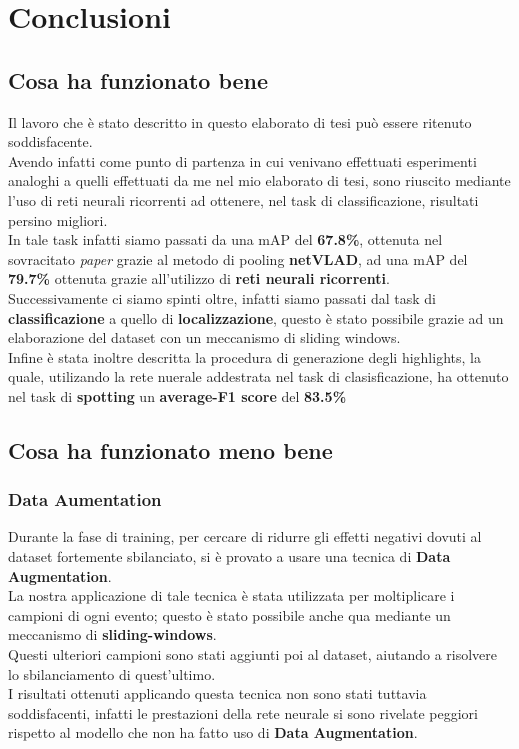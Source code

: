 \chapter{Conclusioni}\label{ch:conclusioni}
\section{Cosa ha funzionato bene}
Il lavoro che è stato descritto in questo elaborato di tesi può essere ritenuto soddisfacente.
\\Avendo infatti come punto di partenza \cite{soccerNet} in cui venivano effettuati esperimenti analoghi a quelli effettuati da me nel mio elaborato di tesi, sono riuscito mediante l'uso di reti neurali ricorrenti ad ottenere, nel task di classificazione, risultati persino migliori.
\\In tale task infatti siamo passati da una mAP del\textbf{ 67.8\%}, ottenuta nel sovracitato \textit{paper} grazie al metodo di pooling \textbf{netVLAD}, ad una mAP del \textbf{79.7\%} ottenuta grazie all'utilizzo di \textbf{reti neurali ricorrenti}.
\\Successivamente ci siamo spinti oltre, infatti siamo passati dal task di \textbf{classificazione} a quello di \textbf{localizzazione}, questo è stato possibile grazie ad un elaborazione del dataset con un meccanismo di sliding windows.
\\Infine è stata inoltre descritta la procedura di generazione degli highlights, la quale, utilizando la rete nuerale addestrata nel task di clasisficazione, ha ottenuto nel task di \textbf{spotting} un \textbf{average-F1 score} del \textbf{83.5\%}
\section{Cosa ha funzionato meno bene}
\subsection{Data Aumentation}
Durante la fase di training, per cercare di ridurre gli effetti negativi dovuti al dataset fortemente sbilanciato, si è provato a usare una tecnica di \textbf{Data Augmentation}.
\\La nostra applicazione di tale tecnica è stata utilizzata per moltiplicare i campioni di ogni evento; questo è stato possibile anche qua mediante un meccanismo di \textbf{sliding-windows}.
\\Questi ulteriori campioni sono stati aggiunti poi al dataset, aiutando a risolvere lo sbilanciamento di quest'ultimo.
\\I risultati ottenuti applicando questa tecnica non sono stati tuttavia soddisfacenti, infatti le prestazioni della rete neurale si sono rivelate peggiori rispetto al modello che non ha fatto uso di \textbf{Data Augmentation}.
